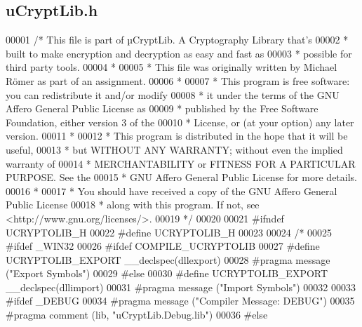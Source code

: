 \hypertarget{uCryptLib_8h_source}{}\subsection{u\+Crypt\+Lib.\+h}

\begin{DoxyCode}
00001 \textcolor{comment}{/*  This file is part of µCryptLib. A Cryptography Library that's}
00002 \textcolor{comment}{ *  built to make encryption and decryption as easy and fast as}
00003 \textcolor{comment}{ *  possible for third party tools.}
00004 \textcolor{comment}{ *}
00005 \textcolor{comment}{ *  This file was originally written by Michael Römer as part of an assignment.}
00006 \textcolor{comment}{ *}
00007 \textcolor{comment}{ *  This program is free software: you can redistribute it and/or modify}
00008 \textcolor{comment}{ *  it under the terms of the GNU Affero General Public License as}
00009 \textcolor{comment}{ *  published by the Free Software Foundation, either version 3 of the}
00010 \textcolor{comment}{ *  License, or (at your option) any later version.}
00011 \textcolor{comment}{ *}
00012 \textcolor{comment}{ *  This program is distributed in the hope that it will be useful,}
00013 \textcolor{comment}{ *  but WITHOUT ANY WARRANTY; without even the implied warranty of}
00014 \textcolor{comment}{ *  MERCHANTABILITY or FITNESS FOR A PARTICULAR PURPOSE.  See the}
00015 \textcolor{comment}{ *  GNU Affero General Public License for more details.}
00016 \textcolor{comment}{ *}
00017 \textcolor{comment}{ *  You should have received a copy of the GNU Affero General Public License}
00018 \textcolor{comment}{ *  along with this program.  If not, see <http://www.gnu.org/licenses/>.}
00019 \textcolor{comment}{ */}
00020 
00021 \textcolor{preprocessor}{#ifndef UCRYPTOLIB\_H}
00022 \textcolor{preprocessor}{#define UCRYPTOLIB\_H}
00023 
00024 \textcolor{comment}{/*}
00025 \textcolor{comment}{#ifdef \_WIN32}
00026 \textcolor{comment}{  #ifdef COMPILE\_UCRYPTOLIB}
00027 \textcolor{comment}{    #define UCRYPTOLIB\_EXPORT \_\_declspec(dllexport)}
00028 \textcolor{comment}{    #pragma message ("Export Symbols")}
00029 \textcolor{comment}{  #else}
00030 \textcolor{comment}{    #define UCRYPTOLIB\_EXPORT \_\_declspec(dllimport)}
00031 \textcolor{comment}{    #pragma message ("Import Symbols")}
00032 \textcolor{comment}{}
00033 \textcolor{comment}{    #ifdef \_DEBUG}
00034 \textcolor{comment}{      #pragma message ("Compiler Message: DEBUG")}
00035 \textcolor{comment}{      #pragma comment (lib, "uCryptLib.Debug.lib")}
00036 \textcolor{comment}{    #else}

\end{DoxyCode}
